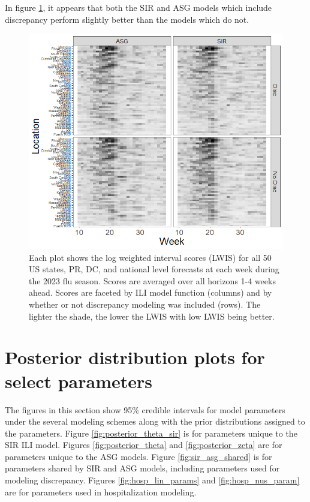 \documentclass[ba]{imsart}
\theoremstyle{plain}
\theoremstyle{definition}
\theoremstyle{remark}
\begin{document}
\begin{supplement}

In figure \ref{fig:lwis_by_traj_loc}, it appears that both the SIR and ASG models which include discrepancy perform slightly better than the models which do not.

\begin{figure}[hbt!]
    
    \centering
    \includegraphics[scale = .7]{Images/lwis_by_traj_loc.png}
    \caption{Each plot shows the log weighted interval scores (LWIS) for all 50 US states, PR, DC, and national level forecasts at each week during the 2023 flu season. Scores are averaged over all horizons 1-4 weeks ahead. Scores are faceted by ILI model function (columns) and by whether or not discrepancy modeling was included (rows). The lighter the shade, the lower the LWIS with low LWIS being better.}
    \label{fig:lwis_by_traj_loc}
\end{figure}



\section{Posterior distribution plots for select parameters}
\label{app:B_prior}

The figures in this section show 95\% credible intervals for model parameters under the several modeling schemes along with the prior distributions assigned to the parameters. Figure \ref{fig:posterior_theta_sir} is for parameters unique to the SIR ILI model. Figures \ref{fig:posterior_theta} and \ref{fig:posterior_zeta} are for parameters unique to the ASG models. Figure \ref{fig:sir_asg_shared} is for parameters shared by SIR and ASG models, including parameters used for modeling discrepancy. Figures \ref{fig:hosp_lin_params} and \ref{fig:hosp_nus_param} are for parameters used in hospitalization modeling.



\end{supplement}
\end{document}

